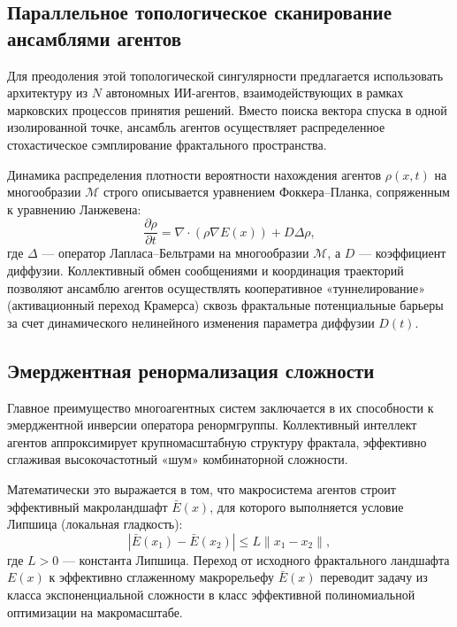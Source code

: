 \documentclass[12pt,a4paper]{article}
\begin{document}
\subsection{Параллельное топологическое сканирование ансамблями агентов}

Для преодоления этой топологической сингулярности предлагается использовать архитектуру из $N$ автономных ИИ-агентов, взаимодействующих в рамках марковских процессов принятия решений. Вместо поиска вектора спуска в одной изолированной точке, ансамбль агентов осуществляет распределенное стохастическое сэмплирование фрактального пространства.

Динамика распределения плотности вероятности нахождения агентов $\rho(x,t)$ на многообразии $\mathcal{M}$ строго описывается уравнением Фоккера–Планка, сопряженным к уравнению Ланжевена:
\begin{equation}
\frac{\partial \rho}{\partial t} = \nabla \cdot (\rho \nabla E(x)) + D \Delta \rho,
\end{equation}
где $\Delta$ — оператор Лапласа–Бельтрами на многообразии $\mathcal{M}$, а $D$ — коэффициент диффузии. Коллективный обмен сообщениями и координация траекторий позволяют ансамблю агентов осуществлять кооперативное «туннелирование» (активационный переход Крамерса) сквозь фрактальные потенциальные барьеры за счет динамического нелинейного изменения параметра диффузии $D(t)$.

\subsection{Эмерджентная ренормализация сложности}

Главное преимущество многоагентных систем заключается в их способности к эмерджентной инверсии оператора ренормгруппы. Коллективный интеллект агентов аппроксимирует крупномасштабную структуру фрактала, эффективно сглаживая высокочастотный «шум» комбинаторной сложности.

Математически это выражается в том, что макросистема агентов строит эффективный макроландшафт $\bar{E}(x)$, для которого выполняется условие Липшица (локальная гладкость):
\begin{equation}
|\bar{E}(x_1) - \bar{E}(x_2)| \le L \|x_1 - x_2\|,
\end{equation}
где $L > 0$ — константа Липшица. Переход от исходного фрактального ландшафта $E(x)$ к эффективно сглаженному макрорельефу $\bar{E}(x)$ переводит задачу из класса экспоненциальной сложности в класс эффективной полиномиальной оптимизации на макромасштабе.
\end{document}
